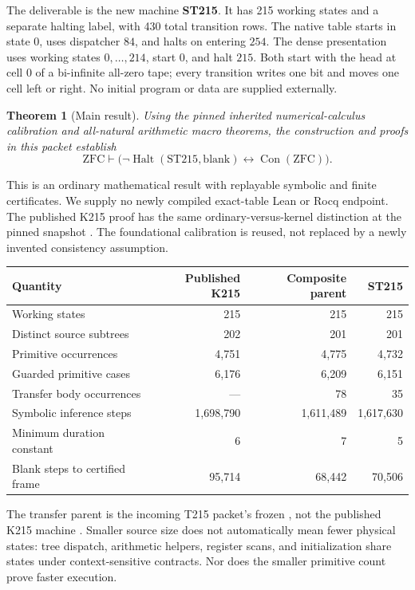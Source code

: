 \documentclass[11pt]{article}
\newtheorem{theorem}{Theorem}
\newcommand{\Con}{\operatorname{Con}}
\newcommand{\Halt}{\operatorname{Halt}}
\newcommand{\file}[1]{{\small\path{#1}}}
\begin{document}
The deliverable is the new machine \textbf{ST215}. It has 215 working
states and a separate halting label, with 430 total transition rows.
The native table starts in state $0$, uses dispatcher $84$, and halts
on entering $254$. The dense presentation uses working states
$0,\ldots,214$, start $0$, and halt $215$. Both start with the head at
cell $0$ of a bi-infinite all-zero tape; every transition writes one
bit and moves one cell left or right. No initial program or data are
supplied externally.

\begin{theorem}[Main result]
\label{thm:main}
Using the pinned inherited numerical-calculus calibration and
all-natural arithmetic macro theorems, the construction and proofs
in this packet establish
\[
 \mathrm{ZFC}\vdash
 \bigl(\neg\Halt(\mathrm{ST215},\mathrm{blank})
       \longleftrightarrow \Con(\mathrm{ZFC})\bigr).
\]
\end{theorem}

This is an ordinary mathematical result with replayable symbolic and
finite certificates. We supply no newly compiled exact-table Lean or
Rocq endpoint. The published K215 proof has the same ordinary-versus-kernel
distinction at the pinned snapshot \cite{repo,k215}. The foundational
calibration is reused, not replaced by a newly invented consistency
assumption.

\begin{center}\small
\begin{tabular}{lrrr}
\toprule
Quantity & Published K215 & Composite parent & ST215\\
\midrule
Working states &215&215&215\\
Distinct source subtrees &202&201&201\\
Primitive occurrences &4,751&4,775&4,732\\
Guarded primitive cases &6,176&6,209&6,151\\
Transfer body occurrences &---&78&35\\
Symbolic inference steps &1,698,790&1,611,489&1,617,630\\
Minimum duration constant &6&7&5\\
Blank steps to certified frame &95,714&68,442&70,506\\
\bottomrule
\end{tabular}
\end{center}

The transfer parent is the incoming T215 packet's frozen
\file{reference/transfer-parent}, not the published K215 machine
\cite{transfer}. Smaller source size does not automatically mean fewer
physical states: tree dispatch, arithmetic helpers, register scans,
and initialization share states under context-sensitive contracts.
Nor does the smaller primitive count prove faster execution.
\end{document}
